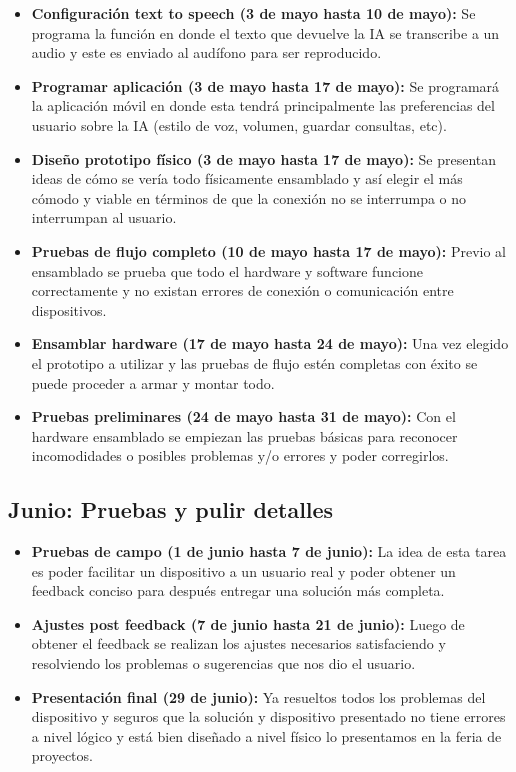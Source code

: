 \documentclass{article}
\begin{document}
\begin{itemize}
    \item\textbf{Configuración text to speech (3 de mayo hasta 10 de mayo):} Se programa la función en donde el texto que devuelve la IA se transcribe a un audio y este es enviado al audífono para ser reproducido.
    
    \item\textbf{Programar aplicación (3 de mayo hasta 17 de mayo):} Se programará la aplicación móvil en donde esta tendrá principalmente las preferencias del usuario sobre la IA (estilo de voz, volumen, guardar consultas, etc).
    
    \item\textbf{Diseño prototipo físico (3 de mayo hasta 17 de mayo):} Se presentan ideas de cómo se vería todo físicamente ensamblado y así elegir el más cómodo y viable en términos de que la conexión no se interrumpa o no interrumpan al usuario.
    
    \item\textbf{Pruebas de flujo completo (10 de mayo hasta 17 de mayo):} Previo al ensamblado se prueba que todo el hardware y software funcione correctamente y no existan errores de conexión o comunicación entre dispositivos.
    
    \item\textbf{Ensamblar hardware (17 de mayo hasta 24 de mayo):} Una vez elegido el prototipo a utilizar y las pruebas de flujo estén completas con éxito se puede proceder a armar y montar todo.
    
    \item\textbf{Pruebas preliminares (24 de mayo hasta 31 de mayo):} Con el hardware ensamblado se empiezan las pruebas básicas para reconocer incomodidades o posibles problemas y/o errores y poder corregirlos.
\end{itemize}

\subsection*{Junio: Pruebas y pulir detalles}

\begin{itemize}
    \item\textbf{Pruebas de campo (1 de junio hasta 7 de junio):} La idea de esta tarea es poder facilitar un dispositivo a un usuario real y poder obtener un feedback conciso para después entregar una solución más completa.
    
    \item\textbf{Ajustes post feedback (7 de junio hasta 21 de junio):} Luego de obtener el feedback se realizan los ajustes necesarios satisfaciendo y resolviendo los problemas o sugerencias que nos dio el usuario.
    
    \item\textbf{Presentación final (29 de junio):} Ya resueltos todos los problemas del dispositivo y seguros que la solución y dispositivo presentado no tiene errores a nivel lógico y está bien diseñado a nivel físico lo presentamos en la feria de proyectos.
\end{itemize}
\end{document}
